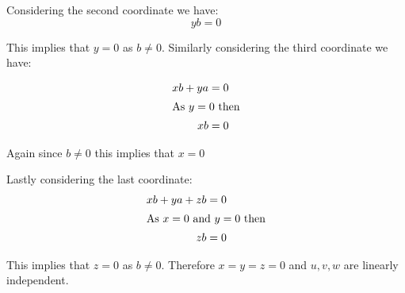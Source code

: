 Considering the second coordinate we have:
\[
	yb = 0
\]

This implies that $y=0$ as $b\neq 0$. Similarly considering the third coordinate we have:

\begin{align*}
	xb+ya & = 0 \\
	\intertext{As $y=0$ then}
	xb    & = 0 \\
\end{align*}

Again since $b\neq 0$ this implies that $x=0$

Lastly considering the last coordinate:
\begin{align*}
	xb+ya+zb & = 0 \\
	\intertext{As $x=0$ and $y=0$ then}
	zb       & = 0 \\
\end{align*}

This implies that $z=0$ as $b\neq 0$. Therefore $x=y=z=0$ and $u,v,w$ are linearly independent.
